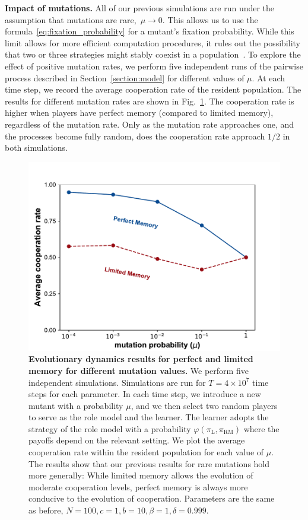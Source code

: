 \documentclass[11pt]{article}
\def\rolemodel{\text{RM}}
\def\learner{\text{L}}
\theoremstyle{plainCl1}
\theoremstyle{plainCl2}
\begin{document}

\noindent
{\bf Impact of mutations.} 
All of our previous simulations are run under the assumption that mutations are rare,~$\mu\!\rightarrow\!0$. 
This allows us to use the formula~\eqref{eq:fixation_probability} for a mutant's fixation probability. 
While this limit allows for more efficient computation procedures, it rules out the possibility that two or three strategies might stably coexist in a population~\cite{tkadlec:pnas:2023}.
To explore the effect of positive mutation rates, we perform five independent runs of the pairwise process described in
Section~\ref{section:model} for different values of $\mu$.
At each time step, we record the average cooperation rate of the resident population. 
The results for different mutation rates are shown in Fig.~\ref{fig:mutation}. 
The cooperation rate is higher when players have perfect memory (compared to limited memory), regardless of the
mutation rate. 
Only as the mutation rate approaches one, and the processes become fully random, does the cooperation rate approach $1/2$ in both simulations.

\begin{figure}[!htbp]
	\centering 
	\includegraphics[width=.5\textwidth]{static/mutation_perfect_and_limited_memory_donation_game.pdf}
	\caption{\textbf{Evolutionary dynamics results for perfect and limited memory
			for different mutation values.}
		We perform five independent simulations. Simulations are run
		for $T\!=\!4\times 10^7$ time steps for each parameter. In each time step,
		we introduce a new mutant with a probability \(\mu\), and we then select
		two random players to serve as the role model and the learner. The learner
		adopts the strategy of the role model with a probability \(\varphi(\pi_\learner, \pi_\rolemodel)\) where the
		payoffs depend on the relevant setting. We plot the average cooperation rate
		within the resident population for each value of \(\mu\). 
		The results show that our previous results for rare mutations hold more generally:
		While limited memory allows the evolution of moderate cooperation levels, perfect memory is always more conducive to the evolution of cooperation. 
		Parameters are the same as before, \(N =100, c=1, b=10, \beta=1, \delta=0.999\).}\label{fig:mutation}
\end{figure}
\end{document}
